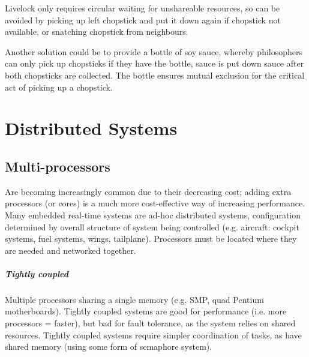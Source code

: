 \documentclass[a4paper,oneside]{report}
\begin{document}
 	 	Livelock only requires circular waiting for unshareable resources, so can be avoided by picking up left chopstick and put it down again if chopstick not available, or snatching chopstick from neighbours.
    	 
Another solution could be to provide a bottle of soy sauce, whereby philosophers can only pick up chopsticks if they have the bottle, sauce is put down sauce after both chopsticks are collected. The bottle ensures mutual exclusion for the critical act of picking up a chopstick.
    	
\chapter{Distributed Systems}

	\section{Multi-processors}
	
	Are becoming increasingly common due to their decreasing cost; adding extra processors (or cores) is a much more cost-effective way of increasing performance. Many embedded real-time systems are ad-hoc distributed systems, configuration determined by overall structure of system being controlled (e.g. aircraft: cockpit systems, fuel systems, wings, tailplane). Processors must be located where they are needed and networked together.
	
    	\paragraph{Tightly coupled}	Multiple processors sharing a single memory (e.g. SMP, quad Pentium motherboards). Tightly coupled systems are good for performance (i.e. more processors = faster), but bad for fault tolerance, as the system relies on shared resources. Tightly coupled systems require simpler coordination of tasks, as have shared memory (using some form of semaphore system).
    	
\end{document}
